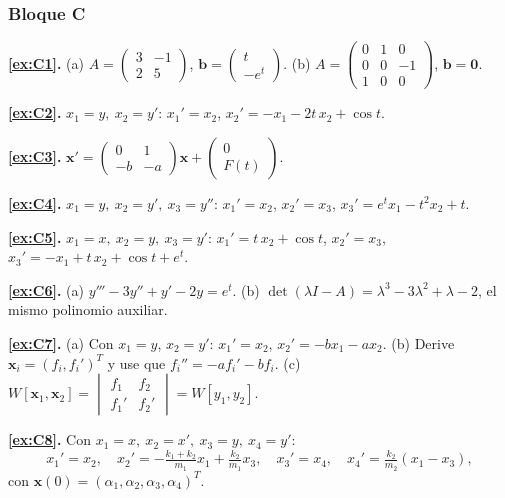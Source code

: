 \subsubsection*{Bloque C}
\noindent\textbf{\ref{ex:C1}.} (a) $A = \begin{pmatrix}3&-1\\2&5\end{pmatrix}$, $\mathbf{b} = \begin{pmatrix}t\\-e^t\end{pmatrix}$. (b) $A = \begin{pmatrix}0&1&0\\0&0&-1\\1&0&0\end{pmatrix}$, $\mathbf{b} = \mathbf{0}$.

\noindent\textbf{\ref{ex:C2}.} $x_1 = y,\ x_2 = y'$: \; $x_1' = x_2$, \; $x_2' = -x_1 - 2t\,x_2 + \cos t$.

\noindent\textbf{\ref{ex:C3}.} $\mathbf{x}' = \begin{pmatrix}0&1\\-b&-a\end{pmatrix}\mathbf{x} + \begin{pmatrix}0\\F(t)\end{pmatrix}$.

\noindent\textbf{\ref{ex:C4}.} $x_1 = y,\ x_2 = y',\ x_3 = y''$: \; $x_1' = x_2$, \; $x_2' = x_3$, \; $x_3' = e^t x_1 - t^2 x_2 + t$.

\noindent\textbf{\ref{ex:C5}.} $x_1 = x,\ x_2 = y,\ x_3 = y'$: \; $x_1' = t\,x_2 + \cos t$, \; $x_2' = x_3$, \; $x_3' = -x_1 + t\,x_2 + \cos t + e^t$.

\noindent\textbf{\ref{ex:C6}.} (a) $y''' - 3y'' + y' - 2y = e^t$. (b) $\det(\lambda I - A) = \lambda^3 - 3\lambda^2 + \lambda - 2$, el mismo polinomio auxiliar.

\noindent\textbf{\ref{ex:C7}.} (a) Con $x_1 = y$, $x_2 = y'$: $x_1' = x_2$, $x_2' = -b x_1 - a x_2$. (b) Derive $\mathbf{x}_i = (f_i, f_i')^T$ y use que $f_i'' = -a f_i' - b f_i$. (c) $W[\mathbf{x}_1,\mathbf{x}_2] = \begin{vmatrix} f_1 & f_2\\ f_1' & f_2'\end{vmatrix} = W[y_1,y_2]$.

\noindent\textbf{\ref{ex:C8}.} Con $x_1 = x,\ x_2 = x',\ x_3 = y,\ x_4 = y'$:
\[
x_1' = x_2,\quad x_2' = -\tfrac{k_1 + k_2}{m_1}x_1 + \tfrac{k_2}{m_1}x_3,\quad x_3' = x_4,\quad x_4' = \tfrac{k_2}{m_2}(x_1 - x_3),
\]
con $\mathbf{x}(0) = (\alpha_1,\alpha_2,\alpha_3,\alpha_4)^T$.

